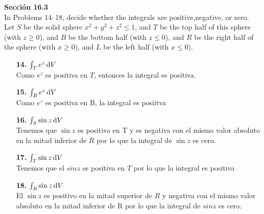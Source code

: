 \documentclass[11pt]{report}
\begin{document}
\textbf{Sección 16.3} \\

In Problems 14–18, decide whether the integrals are positive,negative, or zero.
Let $S$ be the solid sphere $x^2 + y^2 + z^2 \leq 1$, and $T$ be the top half of
this sphere (with $z \geq 0$), and $B$ be the bottom half (with $z \leq 0$), and $R$
be the right half of the sphere (with $x \geq 0$), and $L$ be the left half
(with $x \leq 0$). \\
\begin{itemize}
	\item[\textbf{14.}]$ \int _T e^z \, \text dV$\\
	Como $e^z$ es positiva en $T$, entonces la integral es positiva.

	\item[\textbf{15.}]$ \int _B e^z \, \text dV $\\
	Como $e^z$ es positiva en B, la integral es posiitva

	\item[\textbf{16.}]$\int _S \sin{z} \, \text dV$\\
	Tenemos que $\sin z$ es positiva en T y  es negativa con el mismo valor absoluto en la
	mitad inferior de $R$ por lo que la integral de $\sin z$ es cero.

	\item[\textbf{17.}]$ \int _T \sin{z} \, \text dV$\\
	Tenemos que el $sin z $ es positiva en $T$ por lo que la integral es positiva

	\item[\textbf{18.}]$\int _R \sin{z} \, \text dV $\\
	El $\sin z$ es positivo en la mitad superior de $R$ y negativa con el mismo valor absoluto
	en la mitad inferior de R por lo que la integral de $sin z$ es cero.
\end{itemize}
\end{document}
